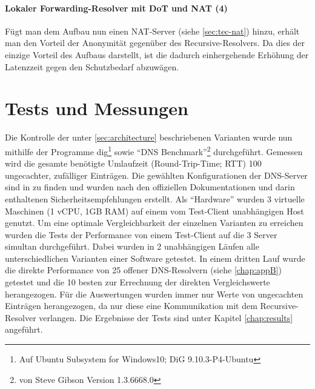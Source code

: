 \paragraph{Lokaler Forwarding-Resolver mit DoT und NAT (4)}
Fügt man dem Aufbau nun einen NAT-Server (siehe \ref{sec:tec-nat}) hinzu, erhält man den Vorteil der Anonymität gegenüber des Recursive-Resolvers. Da dies der einzige Vorteil des Aufbaus darstellt, ist die dadurch einhergehende Erhöhung der Latenzzeit gegen den Schutzbedarf abzuwägen.

\section{Tests und Messungen}
\label{sec:measurements}
Die Kontrolle der unter \ref{sec:architecture} beschriebenen Varianten wurde nun mithilfe der Programme dig\footnote{Auf Ubuntu Subsystem for Windows10; DiG 9.10.3-P4-Ubuntu} sowie ``DNS Benchmark''\footnote{von Steve Gibson Version 1.3.6668.0} durchgeführt. Gemessen wird die gesamte benötigte Umlaufzeit (Round-Trip-Time; RTT) 100 ungecachter, zufälliger Einträgen. Die gewählten Konfigurationen der DNS-Server sind in  zu finden und wurden nach den offiziellen Dokumentationen und darin enthaltenen Sicherheitsempfehlungen erstellt. Als ``Hardware'' wurden 3 virtuelle Maschinen (1 vCPU, 1GB RAM) auf einem vom Test-Client unabhängigen Host genutzt. Um eine optimale Vergleichbarkeit der einzelnen Varianten zu erreichen wurden die Tests der Performance von einem Test-Client auf die 3 Server simultan durchgeführt. Dabei wurden in 2 unabhängigen Läufen alle unterschiedlichen Varianten einer Software getestet. In einem dritten Lauf wurde die direkte Performance von 25 offener DNS-Resolvern (siehe \ref{chap:appB}) getestet und die 10 besten zur Errechnung der direkten Vergleichswerte herangezogen. Für die Auswertungen wurden immer nur Werte von ungecachten Einträgen herangezogen, da nur diese eine Kommunikation mit dem Recursive-Resolver verlangen. Die Ergebnisse der Tests sind unter Kapitel \ref{chap:results} angeführt. 

